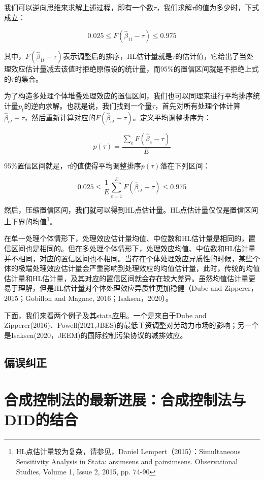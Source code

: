 \documentclass[cn,12pt,math=newtx,citestyle=gb7714-2015,bibstyle=gb7714-2015]{elegantbook}
\begin{document}
     我们可以逆向思维来求解上述过程，即有一个数$\tau$，我们求解$\tau$的值为多少时，下式成立：
     
     $$0.025 \leq F(\hat{\beta}_{1t}-\tau) \leq 0.975$$
     
     其中，$F(\hat{\beta}_{1t}-\tau)$表示调整后的排序，HL估计量就是$\tau$的估计值，它给出了当处理效应估计量减去该值时拒绝原假设的统计量，而95\%的置信区间就是不拒绝上式的$\tau$的集合。
	 
	 为了构造多处理个体堆叠处理效应的置信区间，我们也可以同理来进行平均排序统计量$p_t$的逆向求解。也就是说，我们找到一个量$\tau$，首先对所有处理个体计算$\hat{\beta}_{et}-\tau$，然后重新计算对应的$F(\hat{\beta}_{et}-\tau)$。定义平均调整排序为：
	 
	 $$p(\tau)=\frac{\sum_e F(\hat{\beta}_e-\tau)}{E}$$
	 
	 95\%置信区间就是，$\tau$的值使得平均调整排序$p(\tau)$落在下列区间：
	 
	  $$0.025 \leq \frac{1}{E} \sum_{e=1}^E F(\hat{\beta}_{et}-\tau) \leq 0.975$$
	 
	  然后，压缩置信区间，我们就可以得到HL点估计量。HL点估计量仅仅是置信区间上下界的均值\footnote{HL点估计量较为复杂，请参见，Daniel Lempert（2015）：Simultaneous Sensitivity Analysis in Stata: arsimsens and pairsimsens. Observational Studies, Volume 1, Issue 2, 2015, pp. 74-90}。
	  
	  在单一处理个体情形下，处理效应估计量均值、中位数和HL估计量是相同的，置信区间也是相同的。但在多处理个体情形下，处理效应均值、中位数和HL估计量并不相同，对应的置信区间也不相同。当存在个体处理效应异质性的时候，某些个体的极端处理效应估计量会严重影响到处理效应的均值估计量，此时，传统的均值估计量和HL估计量，及其对应的置信区间就会存在较大差异。虽然均值估计量更易于理解，但是HL估计量对个体处理效应异质性更加稳健（Dube and Zipperer，2015；Gobillon and Magnac, 2016；Isaksen，2020）。
	  
	  下面，我们来看两个例子及其stata应用。一个是来自于Dube and Zipperer(2016)、Powell(2021,JBES)的最低工资调整对劳动力市场的影响；另一个是Isaksen(2020，JEEM)的国际控制污染协议的减排效应。
	  
	  \subsection{偏误纠正}
	    
	    
	
	\section{合成控制法的最新进展：合成控制法与DID的结合}
\end{document}
